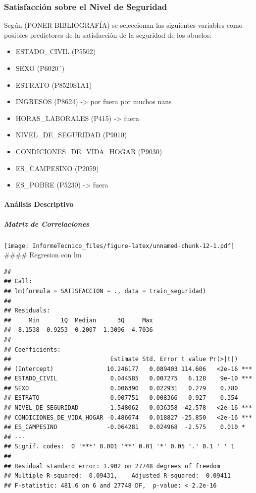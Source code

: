 \documentclass[
]{article}
\providecommand{\tightlist}{%
  \setlength{\itemsep}{0pt}\setlength{\parskip}{0pt}}
\begin{document}
\hypertarget{satisfacciuxf3n-sobre-el-nivel-de-seguridad}{%
\subsubsection{Satisfacción sobre el Nivel de
Seguridad}\label{satisfacciuxf3n-sobre-el-nivel-de-seguridad}}

Según (PONER BIBLIOGRAFÍA) se seleccionan las siguientes variables como
posibles predictores de la satisfacción de la seguridad de los abuelos:

\begin{itemize}
\tightlist
\item
  ESTADO\_CIVIL (P5502)
\item
  SEXO (P6020´)
\item
  ESTRATO (P8520S1A1)
\item
  INGRESOS (P8624) -\textgreater{} por fuera por muchos nans
\item
  HORAS\_LABORALES (P415) -\textgreater{} fuera
\item
  NIVEL\_DE\_SEGURIDAD (P9010)
\item
  CONDICIONES\_DE\_VIDA\_HOGAR (P9030)
\item
  ES\_CAMPESINO (P2059)
\item
  ES\_POBRE (P5230) -\textgreater{} fuera
\end{itemize}

\hypertarget{anuxe1lisis-descriptivo-2}{%
\paragraph{Análisis Descriptivo}\label{anuxe1lisis-descriptivo-2}}

\hypertarget{matriz-de-correlaciones-2}{%
\subparagraph{Matriz de Correlaciones}\label{matriz-de-correlaciones-2}}

\texttt{[image: InformeTecnico\_files/figure-latex/unnamed-chunk-12-1.pdf]}
\#\#\#\# Regresion con lm

\begin{verbatim}
## 
## Call:
## lm(formula = SATISFACCION ~ ., data = train_seguridad)
## 
## Residuals:
##     Min      1Q  Median      3Q     Max 
## -8.1538 -0.9253  0.2007  1.3096  4.7036 
## 
## Coefficients:
##                            Estimate Std. Error t value Pr(>|t|)    
## (Intercept)               10.246177   0.089403 114.606   <2e-16 ***
## ESTADO_CIVIL               0.044585   0.007275   6.128    9e-10 ***
## SEXO                       0.006390   0.022931   0.279    0.780    
## ESTRATO                   -0.007751   0.008366  -0.927    0.354    
## NIVEL_DE_SEGURIDAD        -1.548062   0.036358 -42.578   <2e-16 ***
## CONDICIONES_DE_VIDA_HOGAR -0.486674   0.018827 -25.850   <2e-16 ***
## ES_CAMPESINO              -0.064281   0.024968  -2.575    0.010 *  
## ---
## Signif. codes:  0 '***' 0.001 '**' 0.01 '*' 0.05 '.' 0.1 ' ' 1
## 
## Residual standard error: 1.902 on 27748 degrees of freedom
## Multiple R-squared:  0.09431,    Adjusted R-squared:  0.09411 
## F-statistic: 481.6 on 6 and 27748 DF,  p-value: < 2.2e-16
\end{verbatim}
\end{document}
